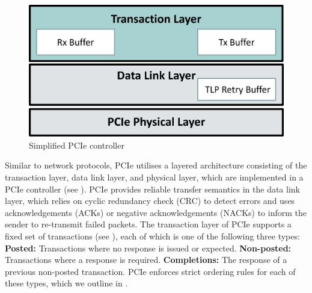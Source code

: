 \begin{figure}[!htb]
    \centering
    \includegraphics[width=\columnwidth]{figures/interconnect-sc/pcie-controller.png}
    \caption{Simplified PCIe controller}
    \label{fig:pcie-controller}
\end{figure}

Similar to network protocols, PCIe utilises a layered architecture consisting of the transaction layer, data link layer, and physical layer, which are implemented in a PCIe controller (see ).
PCIe provides reliable transfer semantics in the data link layer, which relies on cyclic redundancy check (CRC) to detect errors and uses acknowledgements (ACKs) or negative acknowledgements (NACKs) to inform the sender to re-transmit failed packets.
The transaction layer of PCIe supports a fixed set of transactions (see ), each of which is one of the following three types:
\textbf{Posted:} Transactions where no response is issued or expected. 
\textbf{Non-posted:} Transactions where a response is required. 
\textbf{Completions:} The response of a previous non-posted transaction.
PCIe enforces strict ordering rules for each of these types, which we outline in .

